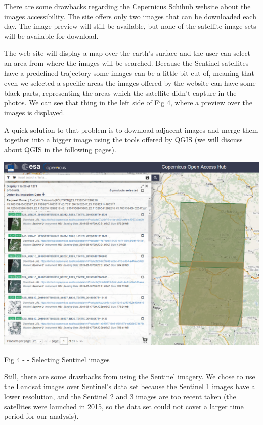 \documentclass[12pt, a4paper]{report}
\begin{document}
There are some drawbacks regarding the Cepernicus Schihub website about the images accessibility. The site offers only two images that can be downloaded each day. The image preview will still be available, but none of the satellite image sets will be available for download. 
\par 

The web site will display a map over the earth's surface and the user can select an area from where the images will be searched. Because the Sentinel satellites have a predefined trajectory some images can be a little bit cut of, meaning that even we selected a specific areas the images offered by the website can have some black parts, representing the areas which the satellite didn't capture in the photos. We can see that thing in the left side of Fig 4, where a preview over the images is displayed.
\par 

A quick solution to that problem is to download adjacent images and merge them together into a bigger image using the tools offered by QGIS (we will discuss about QGIS in the following pages).

\newpage
\bigskip

\includegraphics[scale=0.54, center]{sentinel.png} 
\begin{center}
Fig 4 - \cite{Copernicus} - Selecting Sentinel images
\end{center}
\par 


Still, there are some drawbacks from using the Sentinel imagery. We chose to use the Landsat images over Sentinel's data set because the Sentinel 1 images have a lower resolution, and the Sentinel 2 and 3 images are too recent taken (the satellites were launched in 2015, so the data set could not cover a larger time period for our analysis).
\par 
\end{document}
